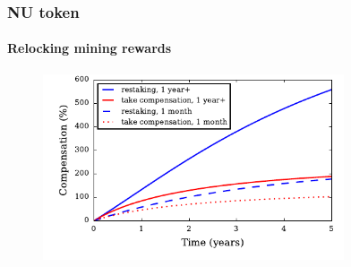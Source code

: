 \documentclass[xetex,mathsans,sans,aspectratio=169]{beamer}
\begin{document}
    \begin{frame}
        \frametitle{NU token}
        \framesubtitle{Relocking mining rewards}
        \begin{figure}
            \centering
            \includegraphics[height=5.5cm]{pdf/total-compensation.pdf}
        \end{figure}
    \end{frame}
\end{document}
